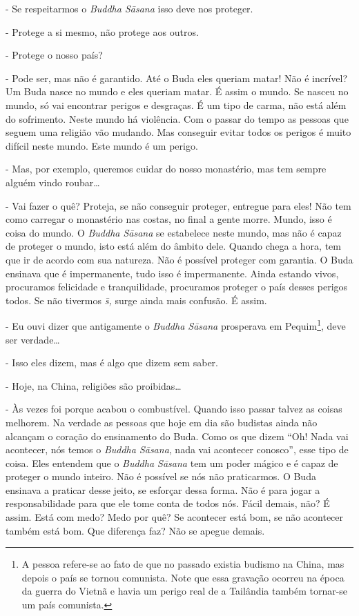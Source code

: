 {}- Se respeitarmos o \textit{Buddha S\=asana} isso deve nos
proteger.

{}- Protege a si mesmo, não protege aos outros.

{}- Protege o nosso país?

{}- Pode ser, mas não é garantido. Até o Buda eles queriam matar!
Não é incrível? Um Buda nasce no mundo e eles queriam matar. É assim o
mundo. Se nasceu no mundo, só vai encontrar perigos e desgraças. É um
tipo de carma, não está além do sofrimento. Neste mundo há violência.
Com o passar do tempo as pessoas que seguem uma religião vão mudando.
Mas conseguir evitar todos os perigos é muito difícil neste mundo. Este
mundo é um perigo.

{}- Mas, por exemplo, queremos cuidar do nosso monastério, mas tem
sempre alguém vindo roubar…

{}- Vai fazer o quê? Proteja, se não conseguir proteger, entregue
para eles! Não tem como carregar o monastério nas costas, no final a
gente morre. Mundo, isso é coisa do mundo. O \textit{Buddha S\=asana}
se estabelece neste mundo, mas não é capaz de proteger o mundo, isto
está além do âmbito dele. Quando chega a hora, tem que ir de acordo com
sua natureza. Não é possível proteger com garantia. O Buda ensinava que
é impermanente, tudo isso é impermanente. Ainda estando vivos,
procuramos felicidade e tranquilidade, procuramos proteger o país
desses perigos todos. Se não tivermos \textit{s\=\ila,} surge ainda
mais confusão. É assim.

{}- Eu ouvi dizer que antigamente o \textit{Buddha S\=asana
}prosperava em Pequim\footnote{A pessoa refere-se ao fato de que no
passado existia budismo na China, mas depois o país se tornou
comunista. Note que essa gravação ocorreu na época da guerra do Vietnã
e havia um perigo real de a Tailândia também tornar-se um país
comunista.}, deve ser verdade…

{}- Isso eles dizem, mas é algo que dizem sem saber.

{}- Hoje, na China, religiões são proibidas…

{}- Às vezes foi porque acabou o combustível. Quando isso passar
talvez as coisas melhorem. Na verdade as pessoas que hoje em dia são
budistas ainda não alcançam o coração do ensinamento do Buda. Como os
que dizem “Oh! Nada vai acontecer, nós temos o \textit{Buddha
S\=asana}, nada vai acontecer conosco”, esse tipo de coisa. Eles
entendem que o \textit{Buddha S\=asana }tem um poder mágico e é capaz
de proteger o mundo inteiro. Não é possível se nós não praticarmos. O
Buda ensinava a praticar desse jeito, se esforçar dessa forma. Não é
para jogar a responsabilidade para que ele tome conta de todos nós.
Fácil demais, não? É assim. Está com medo? Medo por quê? Se acontecer
está bom, se não acontecer também está bom. Que diferença faz? Não se
apegue demais.

